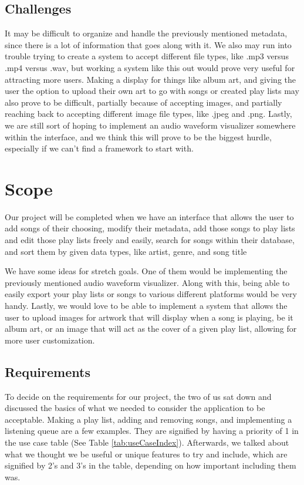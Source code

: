 \documentclass[10pt,conference,onecolumn,compsoc]{IEEEtran}
\begin{document}
\subsection{Challenges}
It may be difficult to organize and handle the previously mentioned metadata, since there is a lot of information that goes along with it. We also may run into trouble trying to create a system to accept different file types, like .mp3 versus .mp4 versus .wav, but working a system like this out would prove very useful for attracting more users. Making a display for things like album art, and giving the user the option to upload their own art to go with songs or created play lists may also prove to be difficult, partially because of accepting images, and partially reaching back to accepting different image file types, like .jpeg and .png. Lastly, we are still sort of hoping to implement an audio waveform visualizer somewhere within the interface, and we think this will prove to be the biggest hurdle, especially if we can't find a framework to start with.


\section{Scope}
Our project will be completed when we have an interface that allows the user to add songs of their choosing, modify their metadata, add those songs to play lists and edit those play lists freely and easily, search for songs within their database, and sort them by given data types, like artist, genre, and song title

We have some ideas for stretch goals. One of them would be implementing the previously mentioned audio waveform visualizer. Along with this, being able to easily export your play lists or songs to various different platforms would be very handy. Lastly, we would love to be able to implement a system that allows the user to upload images for artwork that will display when a song is playing, be it album art, or an image that will act as the cover of a given play list, allowing for more user customization.

\subsection{Requirements}
To decide on the requirements for our project, the two of us sat down and discussed the basics of what we needed to consider the application to be acceptable. Making a play list, adding and removing songs, and implementing a listening queue are a few examples. They are signified by having a priority of 1 in the use case table (See Table \ref{tab:useCaseIndex}). Afterwards, we talked about what we thought we be useful or unique features to try and include, which are signified by 2's and 3's in the table, depending on how important including them was.
\end{document}
